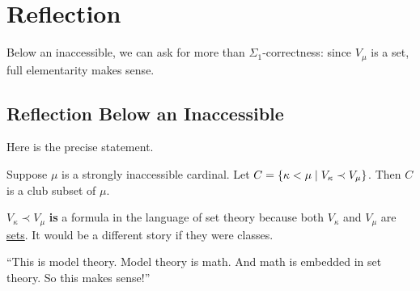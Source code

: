 \section{Reflection}

Below an inaccessible, we can ask for more than $\Sigma_1$-correctness: since $V_{\mu}$ is a set, full elementarity makes sense.

\subsection{Reflection Below an Inaccessible}

Here is the precise statement.

\begin{boxtheorem}
    Suppose $\mu$ is a strongly inaccessible cardinal. Let $C = \left\{ \kappa < \mu \; \middle\vert \; V_{\kappa} \prec V_{\mu} \right\}$. Then $C$ is a club subset of $\mu$.
\end{boxtheorem}

\begin{remark}
    $V_{\kappa} \prec V_{\mu}$ \textbf{is} a formula in the language of set theory because both $V_{\kappa}$ and $V_{\mu}$ are \underline{sets}. It would be a different story if they were classes.

    ``This is model theory. Model theory is math. And math is embedded in set theory. So this makes sense!''
\end{remark}

